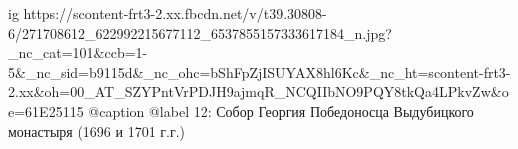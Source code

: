  
 
 
 
 

\ifcmt
  ig https://scontent-frt3-2.xx.fbcdn.net/v/t39.30808-6/271708612_622992215677112_6537855157333617184_n.jpg?_nc_cat=101&ccb=1-5&_nc_sid=b9115d&_nc_ohc=bShFpZjISUYAX8hl6Kc&_nc_ht=scontent-frt3-2.xx&oh=00_AT_SZYPntVrPDJH9ajmqR_NCQIIbNO9PQY8tkQa4LPkvZw&oe=61E25115
  @caption @label 12: Собор Георгия Победоносца Выдубицкого монастыря (1696 и 1701 г.г.)
\fi
